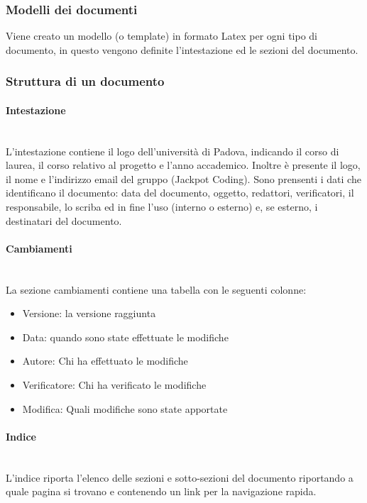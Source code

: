 \documentclass{article}
\begin{document}
\subsubsection{Modelli dei documenti}
Viene creato un modello (o template) in formato Latex per ogni tipo di documento, in questo vengono definite l'intestazione ed le sezioni del documento.

\subsubsection{Struttura di un documento}

\paragraph{Intestazione}~\\
L'intestazione contiene il logo dell'università di Padova, indicando il corso di laurea, il corso relativo al progetto e l'anno accademico. Inoltre è presente il logo, il nome e l'indirizzo email del gruppo (Jackpot Coding).
Sono prensenti i dati che identificano il documento: data del documento, oggetto, redattori, verificatori, il responsabile, lo scriba ed in fine l'uso (interno o esterno) e, se esterno, i destinatari del documento.

\paragraph{Cambiamenti}~\\
La sezione cambiamenti contiene una tabella con le seguenti colonne:
\begin{itemize}
    \item Versione: la versione raggiunta
    \item Data: quando sono state effettuate le modifiche
    \item Autore: Chi ha effettuato le modifiche
    \item Verificatore: Chi ha verificato le modifiche
    \item Modifica: Quali modifiche sono state apportate
\end{itemize}

\paragraph{Indice}~\\
L'indice riporta l'elenco delle sezioni e sotto-sezioni del documento riportando a quale pagina si trovano e contenendo un link per la navigazione rapida.
\end{document}
